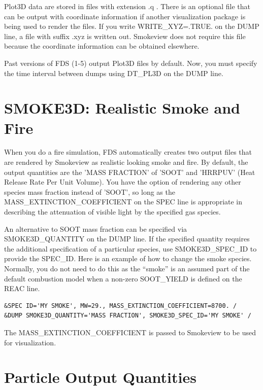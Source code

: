 \documentclass[11pt]{book}
\begin{document}
Plot3D data are stored in files with extension {\ct .q} . There is an optional file that can be output with coordinate information if another visualization package is being used to render the files. If you write {\ct WRITE\_XYZ=.TRUE.} on the {\ct DUMP} line, a file with suffix {\ct .xyz} is written out. Smokeview does not require this file because the coordinate information can be obtained elsewhere.

Past versions of FDS (1-5) output Plot3D files by default. Now, you must specify the time interval between dumps using {\ct DT\_PL3D} on the {\ct DUMP} line.



\section{SMOKE3D: Realistic Smoke and Fire}
\label{info:SMOKE3D}

When you do a fire simulation, FDS automatically creates two output files that are rendered by Smokeview as realistic looking smoke and fire. By default, the output quantities are the {\ct 'MASS FRACTION'} of {\ct 'SOOT'} and {\ct 'HRRPUV'} (Heat Release Rate Per Unit Volume). You have the option of rendering any other species mass fraction instead of {\ct 'SOOT'}, so long as the {\ct MASS\_EXTINCTION\_COEFFICIENT} on the {\ct SPEC} line is appropriate in
describing the attenuation of visible light by the specified gas species.

An alternative to {\ct SOOT} mass fraction can be specified via {\ct SMOKE3D\_QUANTITY} on the {\ct DUMP} line. If the specified quantity requires the additional specification of a particular species, use {\ct SMOKE3D\_SPEC\_ID} to provide the {\ct SPEC\_ID}. Here is an example of how to change the smoke species. Normally, you do not need to do this as the ``smoke'' is an assumed part of the default combustion model when a non-zero {\ct SOOT\_YIELD} is defined on the {\ct REAC} line.
\begin{lstlisting}
&SPEC ID='MY SMOKE', MW=29., MASS_EXTINCTION_COEFFICIENT=8700. /
&DUMP SMOKE3D_QUANTITY='MASS FRACTION', SMOKE3D_SPEC_ID='MY SMOKE' /
\end{lstlisting}
The {\ct MASS\_EXTINCTION\_COEFFICIENT} is passed to Smokeview to be used for visualization.



\section{Particle Output Quantities}
\label{info:part_output}
\end{document}
